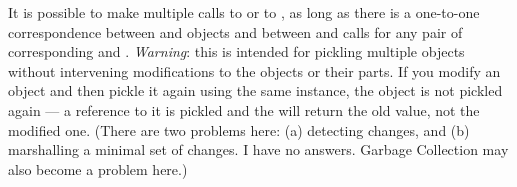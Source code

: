 It is possible to make multiple calls to  or to
, as long as there is a one-to-one
correspondence between  and  objects and
between  and  calls for any pair of
corresponding  and .  {\em Warning}:
this is intended for pickling multiple objects without intervening
modifications to the objects or their parts.  If you modify an object
and then pickle it again using the same  instance, the
object is not pickled again --- a reference to it is pickled and the
 will return the old value, not the modified one.  (There
are two problems here: (a) detecting changes, and (b) marshalling a
minimal set of changes.  I have no answers.  Garbage Collection may
also become a problem here.)
